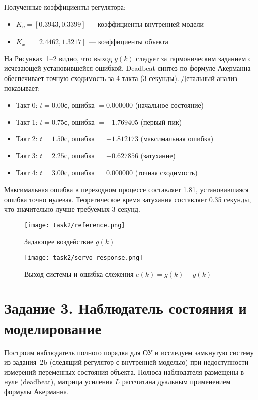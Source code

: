 Полученные коэффициенты регулятора:
\begin{itemize}
    \item $K_\eta = [0.3943, 0.3399]$ — коэффициенты внутренней модели
    \item $K_x = [2.4462, 1.3217]$ — коэффициенты объекта
\end{itemize}

На Рисунках~\ref{fig:task2_ref}--\ref{fig:task2_resp} видно, что выход $y(k)$ следует за гармоническим заданием с исчезающей установившейся ошибкой. Deadbeat-синтез по формуле Акерманна обеспечивает точную сходимость за 4 такта (3 секунды). Детальный анализ показывает:
\begin{itemize}
    \item Такт 0: $t=0.00$с, ошибка $=0.000000$ (начальное состояние)
    \item Такт 1: $t=0.75$с, ошибка $=-1.769405$ (первый пик)
    \item Такт 2: $t=1.50$с, ошибка $=-1.812173$ (максимальная ошибка)
    \item Такт 3: $t=2.25$с, ошибка $=-0.627856$ (затухание)
    \item Такт 4: $t=3.00$с, ошибка $=0.000000$ (точная сходимость)
\end{itemize}
Максимальная ошибка в переходном процессе составляет 1.81, установившаяся ошибка точно нулевая. Теоретическое время затухания составляет 0.35 секунды, что значительно лучше требуемых 3 секунд.

\begin{figure}[H]
    \centering
    \texttt{[image: task2/reference.png]}
    \caption{Задающее воздействие $g(k)$}
    \label{fig:task2_ref}
\end{figure}

\begin{figure}[H]
    \centering
    \texttt{[image: task2/servo\_response.png]}
    \caption{Выход системы и ошибка слежения $e(k)=g(k)-y(k)$}
    \label{fig:task2_resp}
\end{figure}

\section{Задание 3. Наблюдатель состояния и моделирование}
Построим наблюдатель полного порядка для ОУ и исследуем замкнутую систему из задания~2b (следящий регулятор с внутренней моделью) при недоступности измерений переменных состояния объекта. Полюса наблюдателя размещены в нуле (deadbeat), матрица усиления $L$ рассчитана дуальным применением формулы Акерманна.

